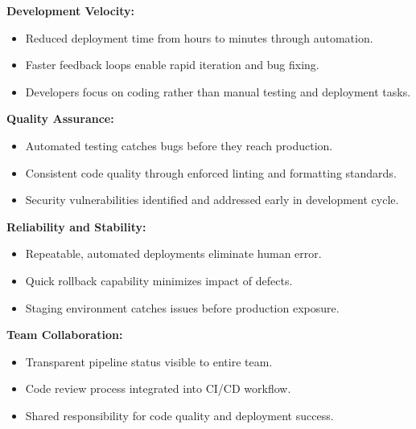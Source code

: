 \documentclass[12pt,a4paper]{article}
\begin{document}
\begin{tcolorbox}[colback=primaryblue!10, colframe=primaryblue, boxrule=1pt, arc=4pt, left=10pt, right=10pt, top=8pt, bottom=8pt]

\textbf{Development Velocity:}

\begin{itemize}[leftmargin=2em, itemsep=6pt]
    \item Reduced deployment time from hours to minutes through automation.
    \item Faster feedback loops enable rapid iteration and bug fixing.
    \item Developers focus on coding rather than manual testing and deployment tasks.
\end{itemize}

\vspace{0.5em}

\textbf{Quality Assurance:}

\begin{itemize}[leftmargin=2em, itemsep=6pt]
    \item Automated testing catches bugs before they reach production.
    \item Consistent code quality through enforced linting and formatting standards.
    \item Security vulnerabilities identified and addressed early in development cycle.
\end{itemize}

\vspace{0.5em}

\textbf{Reliability and Stability:}

\begin{itemize}[leftmargin=2em, itemsep=6pt]
    \item Repeatable, automated deployments eliminate human error.
    \item Quick rollback capability minimizes impact of defects.
    \item Staging environment catches issues before production exposure.
\end{itemize}

\vspace{0.5em}

\textbf{Team Collaboration:}

\begin{itemize}[leftmargin=2em, itemsep=6pt]
    \item Transparent pipeline status visible to entire team.
    \item Code review process integrated into CI/CD workflow.
    \item Shared responsibility for code quality and deployment success.
\end{itemize}

\end{tcolorbox}
\end{document}
